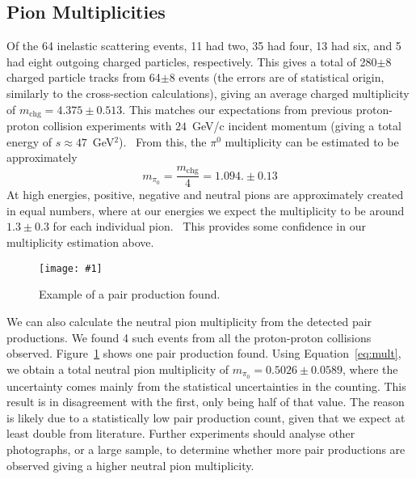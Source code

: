 \documentclass[twocolumn]{article}
\newcommand{\insertFigure}[1]{%
   \texttt{[image: \#1]}%
}
\begin{document}
\subsection{Pion Multiplicities}
Of the 64 inelastic scattering events, 11 had two, 35 had four, 13 had six, and 5 had eight outgoing charged particles, respectively. This gives a total of 280$\pm8$ charged particle tracks from 64$\pm8$ events (the errors are of statistical origin, similarly to the cross-section calculations), giving an average charged multiplicity of $m_{\text{chg}} = 4.375 \pm 0.513$.
This matches our expectations from previous proton-proton collision experiments with $24$~GeV/c incident momentum (giving a total energy of $s \approx 47$~GeV$^2$).~\cite{Fernow} From this, the $\pi^0$ multiplicity can be estimated to be approximately 
\begin{equation}
	m_{\pi_0} = \frac{m_{\text{chg}}}{4} = 1.094. \pm 0.13 \nonumber
\end{equation}
At high energies, positive, negative and neutral pions are approximately created in equal numbers, where at our energies we expect the multiplicity to be around $1.3 \pm 0.3$ for each individual pion.~\cite{perkins, Fernow} This provides some confidence in our multiplicity estimation above.
\begin{figure}[!h]
	\centering
	\insertFigure{pair.png}
	\caption{Example of a pair production found.}
	\label{fig:pair}
\end{figure}
\par We can also calculate the neutral pion multiplicity from the detected pair productions. We found 4 such events from all the proton-proton collisions observed. Figure~\ref{fig:pair} shows one pair production found. Using Equation~\ref{eq:mult}, we obtain a total neutral pion multiplicity of $m_{\pi_0} =  0.5026 \pm 0.0589$, where the uncertainty comes mainly from the statistical uncertainties in the counting. This result is in disagreement with the first, only being half of that value. The reason is likely due to a statistically low pair production count, given that we expect at least double from literature. Further experiments should analyse other photographs, or a large sample, to determine whether more pair productions are observed giving a higher neutral pion multiplicity.
\end{document}
